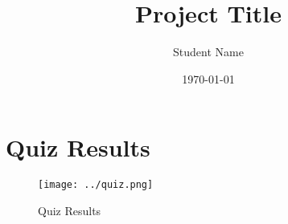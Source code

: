 \documentclass[11pt,a4paper]{sitshonours}
\title{Project Title}
\author{Student Name}
\date{\today}
\begin{document}
\maketitle

\newpage
\thispagestyle{plain}

\newpage
\begin{singlespacing}
    \tableofcontents
\end{singlespacing}
\setlength{\parskip}{1em}
\renewcommand{\baselinestretch}{2.0}

\newpage
{}
\setcounter{page}{1}
\onehalfspacing




\section{Quiz Results}
\begin{figure}[h]
    \centering
    \texttt{[image: ../quiz.png]}
    \caption{Quiz Results}
    \label{fig:quiz_results}
\end{figure}
\newpage
\singlespacing

\end{document}
